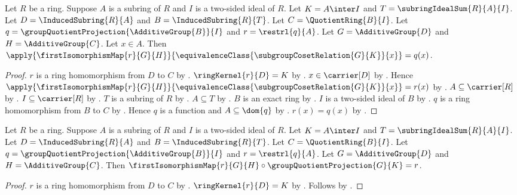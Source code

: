 \begin{proposition}\label{ring_second_isomorphism_map_apply}
    Let $R$ be a ring.
    Suppose $A$ is a subring of $R$ and
        $I$ is a two-sided ideal of $R$.
    Let $K=A\inter I$ and $T=\subringIdealSum{R}{A}{I}$.
    Let $D=\InducedSubring{R}{A}$ and $B=\InducedSubring{R}{T}$.
    Let $C=\QuotientRing{B}{I}$.
    Let $q=\groupQuotientProjection{\AdditiveGroup{B}}{I}$ and
        $r=\restrl{q}{A}$.
    Let $G=\AdditiveGroup{D}$ and $H=\AdditiveGroup{C}$.
    Let $x\in A$.
    Then
        $\apply{\firstIsomorphismMap{r}{G}{H}}{
            \equivalenceClass{\subgroupCosetRelation{G}{K}}{x}}
        =q(x)$.
\end{proposition}
\begin{proof}
    $r$ is a ring homomorphism from $D$ to $C$ by
        .
    $\ringKernel{r}{D}=K$ by
        .
    $x\in\carrier[D]$ by .
    Hence
        $\apply{\firstIsomorphismMap{r}{G}{H}}{
            \equivalenceClass{\subgroupCosetRelation{G}{K}}{x}}
        =r(x)$ by .
    $A\subseteq\carrier[R]$ by .
    $I\subseteq\carrier[R]$ by
        .
    $T$ is a subring of $R$ by .
    $A\subseteq T$ by .
    $B$ is an exact ring by .
    $I$ is a two-sided ideal of $B$ by
        .
    $q$ is a ring homomorphism from $B$ to $C$ by
        .
    Hence $q$ is a function and $A\subseteq\dom{q}$ by
        .
    $r(x)=q(x)$ by .
\end{proof}

\begin{theorem}\label{ring_second_isomorphism_factorization}
    Let $R$ be a ring.
    Suppose $A$ is a subring of $R$ and
        $I$ is a two-sided ideal of $R$.
    Let $K=A\inter I$ and $T=\subringIdealSum{R}{A}{I}$.
    Let $D=\InducedSubring{R}{A}$ and $B=\InducedSubring{R}{T}$.
    Let $C=\QuotientRing{B}{I}$.
    Let $q=\groupQuotientProjection{\AdditiveGroup{B}}{I}$ and
        $r=\restrl{q}{A}$.
    Let $G=\AdditiveGroup{D}$ and $H=\AdditiveGroup{C}$.
    Then
        $\firstIsomorphismMap{r}{G}{H}\circ
            \groupQuotientProjection{G}{K}=r$.
\end{theorem}
\begin{proof}
    $r$ is a ring homomorphism from $D$ to $C$ by
        .
    $\ringKernel{r}{D}=K$ by
        .
    Follows by .
\end{proof}


